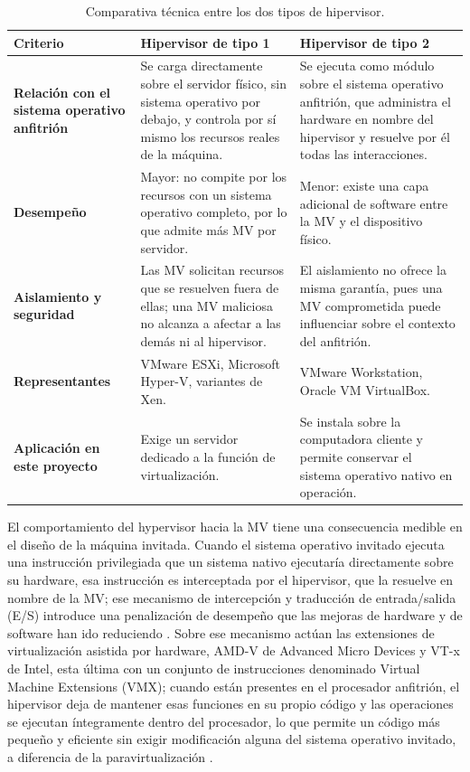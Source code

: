 \documentclass[12pt]{article}
\begin{document}
\begin{table}[htbp]
\centering
\small
\renewcommand{\arraystretch}{1.15}
\renewcommand{\tabularxcolumn}[1]{m{#1}}
\setlength{\emergencystretch}{1.5em}
\caption{Comparativa técnica entre los dos tipos de hipervisor.}
\label{tab:comparativaHipervisores}
\begin{tabularx}{\textwidth}{>{\centering\arraybackslash}m{3.2cm} X X}
\toprule
\textbf{Criterio} & \textbf{Hipervisor de tipo 1} & \textbf{Hipervisor de tipo 2} \\
\midrule
\textbf{Relación con el sistema operativo anfitrión} & Se carga directamente sobre el servidor físico, sin sistema operativo por debajo, y controla por sí mismo los recursos reales de la máquina. & Se ejecuta como módulo sobre el sistema operativo anfitrión, que administra el hardware en nombre del hipervisor y resuelve por él todas las interacciones. \\
\addlinespace
\textbf{Desempeño} & Mayor: no compite por los recursos con un sistema operativo completo, por lo que admite más MV por servidor. & Menor: existe una capa adicional de software entre la MV y el dispositivo físico. \\
\addlinespace
\textbf{Aislamiento y seguridad} & Las MV solicitan recursos que se resuelven fuera de ellas; una MV maliciosa no alcanza a afectar a las demás ni al hipervisor. & El aislamiento no ofrece la misma garantía, pues una MV comprometida puede influenciar sobre el contexto del anfitrión. \\
\addlinespace
\textbf{Representantes} & VMware ESXi, Microsoft Hyper-V, variantes de Xen. & VMware Workstation, Oracle VM VirtualBox. \\
\addlinespace
\textbf{Aplicación en este proyecto} & Exige un servidor dedicado a la función de virtualización. & Se instala sobre la computadora cliente y permite conservar el sistema operativo nativo en operación. \\
\bottomrule
\end{tabularx}
\end{table}

El comportamiento del hypervisor hacia la MV tiene una consecuencia medible en el diseño de la máquina invitada. Cuando el sistema operativo invitado ejecuta una instrucción privilegiada que un sistema nativo ejecutaría directamente sobre su hardware, esa instrucción es interceptada por el hipervisor, que la resuelve en nombre de la MV; ese mecanismo de intercepción y traducción de entrada/salida (E/S) introduce una penalización de desempeño que las mejoras de hardware y de software han ido reduciendo \parencite[\S 14.2, p.\ 631]{stallings2018operating}. Sobre ese mecanismo actúan las extensiones de virtualización asistida por hardware, AMD-V de Advanced Micro Devices y VT-x de Intel, esta última con un conjunto de instrucciones denominado Virtual Machine Extensions (VMX); cuando están presentes en el procesador anfitrión, el hipervisor deja de mantener esas funciones en su propio código y las operaciones se ejecutan íntegramente dentro del procesador, lo que permite un código más pequeño y eficiente sin exigir modificación alguna del sistema operativo invitado, a diferencia de la paravirtualización \parencite[\S 14.2, p.\ 635]{stallings2018operating}.
\end{document}
